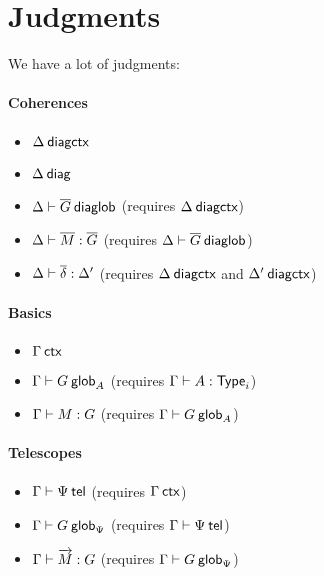 \section{Judgments}




We have a lot of judgments:

\paragraph{Coherences}

\begin{itemize}
\item ${\Delta} \: \mathsf{diagctx}$
\item $\Delta \: \mathsf{diag}$
\item ${\Delta} \vdash {\ensuremath{\overline{G}}} \: \mathsf{diaglob}$ (requires ${\Delta} \: \mathsf{diagctx}$)
\item ${\Delta} \vdash {\ensuremath{\overline{M}}} : {\overline{G}}$
(requires ${\Delta} \vdash {\ensuremath{\overline{G}}} \: \mathsf{diaglob}$)
\item ${\Delta} \vdash {\ensuremath{\overline{\delta}}} : {\Delta'}$
(requires ${\Delta} \: \mathsf{diagctx}$ and ${\Delta'} \: \mathsf{diagctx}$)
\end{itemize}

\paragraph{Basics}

\begin{itemize}
\item ${\Gamma} \: \mathsf{ctx}$
\item ${\Gamma} \vdash {G} \: \mathsf{glob}_{A}$ (requires ${\Gamma} \vdash {A} : {\mathsf{Type}_{i}}$)
\item ${\Gamma} \vdash {M} : {G}$ (requires ${\Gamma} \vdash {G} \: \mathsf{glob}_{A}$)
\end{itemize}

\paragraph{Telescopes}

\begin{itemize}
\item ${\Gamma} \vdash {\Psi} \: \mathsf{tel}$ (requires ${\Gamma} \: \mathsf{ctx}$)
\item ${\Gamma} \vdash {G} \: \mathsf{glob}_{\Psi}$ (requires ${\Gamma} \vdash {\Psi} \: \mathsf{tel}$)
\item ${\Gamma} \vdash {\ensuremath{\overrightarrow{M}}} : {G}$
(requires ${\Gamma} \vdash {G} \: \mathsf{glob}_{\Psi}$)
\end{itemize}

